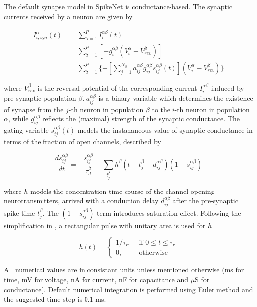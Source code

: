 \documentclass{article}
\begin{document}
The default synapse model in SpikeNet is conductance-based. 
The synaptic currents received by a neuron are given by

\begin{align}
I^{\alpha}_{i,syn}(t) &= \sum_{\beta=1}^{P}I^{\alpha\beta}_{i}(t) \\
 &= \sum_{\beta=1}^{P}[-g_{i}^{\alpha\beta}(V^{\alpha}_{i}-V_{rev}^{\beta})] \\
 &= \sum_{\beta=1}^{P}\{-[\sum_{j=1}^{N_{\beta}}a_{ij}^{\alpha\beta}g_{ij}^{\alpha\beta}s_{ij}^{\alpha\beta}(t)](V^{\alpha}_{i}-V_{rev}^{\beta})\}\label{eq:I_syn}
\end{align}


\noindent
where $V_{rev}^{\beta}$ is the reversal potential of the corresponding current $I^{\alpha\beta}_{i}$ induced by pre-synaptic population $\beta$. 
$a_{ij}^{\alpha\beta}$ is a binary variable which determines the existence of synapse from the $j$-th neuron in population $\beta$ to the $i$-th neuron in  population $\alpha$, while $g_{ij}^{\alpha\beta}$ reflects the (maximal) strength of the synaptic conductance. 
The gating variable $s_{ij}^{\alpha\beta}(t)$ models the instananeous value of synaptic conductance in terms of the fraction of open channels, described by

\begin{equation}
\frac{ds_{ij}^{\alpha\beta}}{dt} = -\frac{s_{ij}^{\alpha\beta}}{\tau_{d}^{\beta}}+\sum_{t^{\beta}_{j}}h^{\beta}(t-t^{\beta}_{j}-d^{\alpha\beta}_{ij})(1-s_{ij}^{\alpha\beta})
\label{eq:gating}
\end{equation}

\noindent
where $h$ models the concentration time-course of the channel-opening neurotransmitters, arrived with a conduction delay $d^{\alpha\beta}_{ij}$ after the pre-synaptic spike time $t^{\beta}_{j}$. 
The $(1-s_{ij}^{\alpha\beta})$ term introduces saturation effect. 
Following the simplification in \cite{destexhe1994efficient}, a rectangular pulse with unitary area is used for $h$

\begin{equation}
h(t) = 
\begin{cases}
1/\tau_{r},& \text{ if } 0\leq t \leq \tau_{r}\\
0,& \text{ otherwise}
\end{cases}
\end{equation}


All numerical values are in consistant units unless mentioned otherwise (ms for time, mV for voltage, nA for current, nF for capacitance and ${\mu}$S for conductance). 
Default numerical integration is performed using Euler method and the suggested time-step is 0.1 ms\cite{litwin2012slow}.
\end{document}
